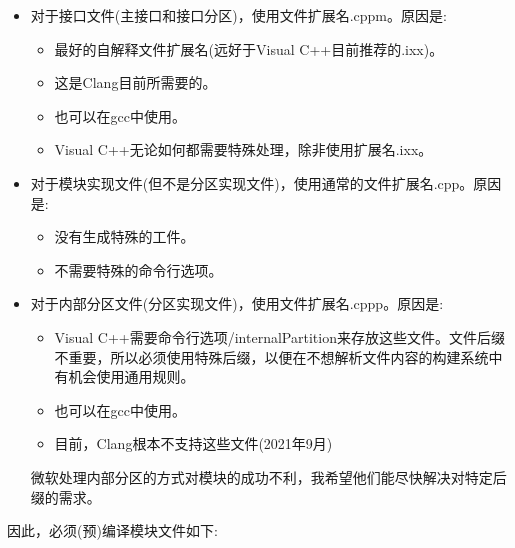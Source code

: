 \begin{itemize}
\item
对于接口文件(主接口和接口分区)，使用文件扩展名.cppm。原因是:

\begin{itemize}
\item
最好的自解释文件扩展名(远好于Visual C++目前推荐的.ixx)。

\item
这是Clang目前所需要的。

\item
也可以在gcc中使用。

\item
Visual C++无论如何都需要特殊处理，除非使用扩展名.ixx。
\end{itemize}


\item
对于模块实现文件(但不是分区实现文件)，使用通常的文件扩展名.cpp。原因是:

\begin{itemize}
\item
没有生成特殊的工件。

\item
不需要特殊的命令行选项。
\end{itemize}

\item
对于内部分区文件(分区实现文件)，使用文件扩展名.cppp。原因是:

\begin{itemize}
\item
Visual C++需要命令行选项/internalPartition来存放这些文件。文件后缀不重要，所以必须使用特殊后缀，以便在不想解析文件内容的构建系统中有机会使用通用规则。

\item
也可以在gcc中使用。

\item
目前，Clang根本不支持这些文件(2021年9月)
\end{itemize}

微软处理内部分区的方式对模块的成功不利，我希望他们能尽快解决对特定后缀的需求。

\end{itemize}

因此，必须(预)编译模块文件如下:

